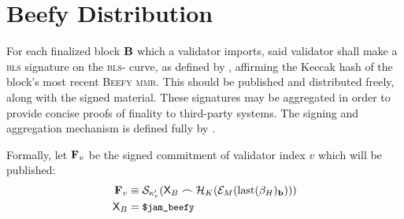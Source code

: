 \section{Beefy Distribution}\label{sec:beefy}

For each finalized block $\mathbf{B}$ which a validator imports, said validator shall make a \textsc{bls} signature on the \textsc{bls}- curve, as defined by \cite{bls12-381}, affirming the Keccak hash of the block's most recent \textsc{Beefy} \textsc{mmr}. This should be published and distributed freely, along with the signed material. These signatures may be aggregated in order to provide concise proofs of finality to third-party systems. The signing and aggregation mechanism is defined fully by \cite{cryptoeprint:2022/1611}.

Formally, let $\mathbf{F}_{v}$ be the signed commitment of validator index $v$ which will be published:
\begin{align}\label{eq:beefysignedcommitment}
  \mathbf{F}\sub{v} &\equiv \signdata_{\activeset'\sub{v}}(\mathsf{X}_B\concat\keccak(\Fmmrencode{\text{last}(\recenthistory)_\mathbf{b}}))\\
  \mathsf{X}_B &= \token{\$jam\_beefy}
\end{align}
